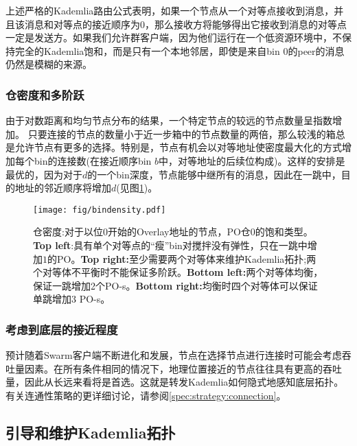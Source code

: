 上述严格的Kademlia路由公式表明，如果一个节点从一个对等点接收到消息，并且该消息和对等点的接近顺序为$0$，那么接收方将能够得出它接收到消息的对等点一定是发送方。如果我们允许群客户端，因为他们运行在一个低资源环境中，不保持完全的Kademlia饱和，而是只有一个本地邻居，即使是来自bin $0$的peer的消息仍然是模糊的来源。 

\subsubsection{仓密度和多阶跃} \label{sec:bindensity}

由于对数距离和均匀节点分布的结果，一个特定节点的较远的节点数量呈指数增加。
只要连接的节点的数量小于近一步箱中的节点数量的两倍，那么较浅的箱总是允许节点有更多的选择。特别是，节点有机会以对等地址使密度最大化的方式增加每个bin的连接数(在接近顺序bin $b$中，对等地址的后续位构成)。这样的安排是最优的，因为对于$d$的一个bin深度，节点能够中继所有的消息，因此在一跳中，目的地址的邻近顺序将增加$d$(见图\ref{fig:bindensity})。 


\begin{figure}[htbp]
   \centering
   \texttt{[image: fig/bindensity.pdf]}
   \caption[本密度\statusgreen]{仓密度:对于以位$0$开始的Overlay地址的节点，PO仓$0$的饱和类型。\textbf{Top left}:具有单个对等点的“瘦”bin对搅拌没有弹性，只在一跳中增加$1$的PO。\textbf{Top right:}至少需要两个对等体来维护Kademlia拓扑;两个对等体不平衡时不能保证多阶跃。\textbf{Bottom left:}两个对等体均衡，保证一跳增加2个PO-s。\textbf{Bottom right:}均衡时四个对等体可以保证单跳增加$3$ PO-s。}
   \label{fig:bindensity}
\end{figure}

\subsubsection{考虑到底层的接近程度}
预计随着Swarm客户端不断进化和发展，节点在选择节点进行连接时可能会考虑吞吐量因素。在所有条件相同的情况下，地理位置接近的节点往往具有更高的吞吐量，因此从长远来看将是首选。这就是转发Kademlia如何隐式地感知底层拓扑\cite{heep2010r}。有关连通性策略的更详细讨论，请参阅\ref{spec:strategy:connection}。


\subsection{引导和维护Kademlia拓扑\statusgreen}\label{sec:bootstrapping}
 
 
